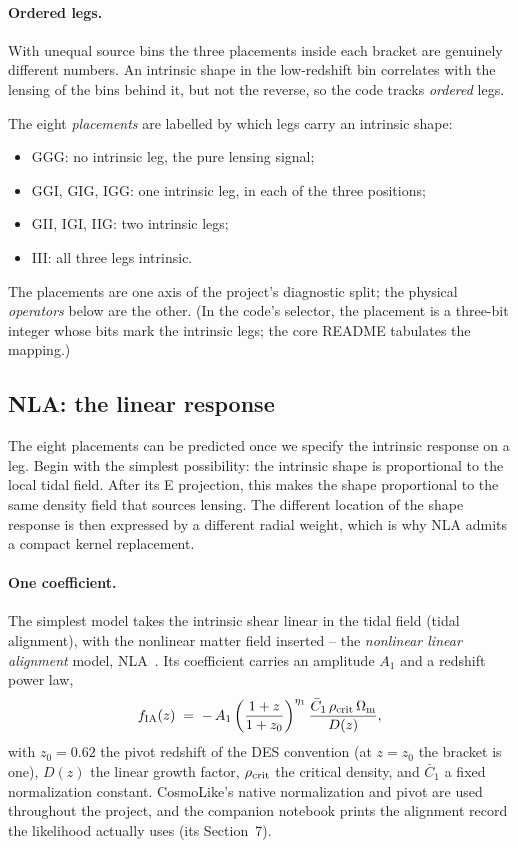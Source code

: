 \documentclass[11pt]{article}
\numberwithin{equation}{section}
\begin{document}
\paragraph{Ordered legs.}
With unequal source bins the three placements inside each bracket
are genuinely different numbers.  An intrinsic shape in the
low-redshift bin correlates with the lensing of the bins behind it,
but not the reverse, so the code tracks \emph{ordered} legs.

The eight \emph{placements} are labelled by which legs carry an
intrinsic shape:
\begin{itemize}
  \item GGG: no intrinsic leg, the pure lensing signal;
  \item GGI, GIG, IGG: one intrinsic leg, in each of the three
    positions;
  \item GII, IGI, IIG: two intrinsic legs;
  \item III: all three legs intrinsic.
\end{itemize}
The placements are one axis of the project's diagnostic split; the
physical \emph{operators} below are the other.  (In the code's
selector, the placement is a three-bit integer whose bits mark the
intrinsic legs; the core README tabulates the mapping.)

\subsection{NLA: the linear response}
\label{sec:nla}

The eight placements can be predicted once we specify the intrinsic
response on a leg. Begin with the simplest possibility: the intrinsic
shape is proportional to the local tidal field. After its E projection,
this makes the shape proportional to the same density field that sources
lensing. The different location of the shape response is then expressed
by a different radial weight, which is why NLA admits a compact kernel
replacement.

\paragraph{One coefficient.}
The simplest model takes the intrinsic shear linear in the tidal
field (tidal alignment), with the nonlinear matter field inserted --
the \emph{nonlinear linear alignment} model, NLA~\cite{HirataSeljak,
BridleKing}.  Its coefficient carries an amplitude $A_1$ and a
redshift power law,
\begin{equation}
  f_{\rm IA}(z)
  \;=\;
  -\,A_1
  \left(\frac{1+z}{1+z_0}\right)^{\eta_1}
  \frac{\bar C_1\, \rho_{\rm crit}\, \Omega_{\rm m}}{D(z)} ,
  \label{eq:fia}
\end{equation}
with $z_0 = 0.62$ the pivot redshift of the DES convention (at
$z = z_0$ the bracket is one), $D(z)$ the linear growth factor,
$\rho_{\rm crit}$ the critical density, and $\bar C_1$ a fixed
normalization constant.  CosmoLike's native normalization and pivot
are used throughout the project, and the companion notebook prints
the alignment record the likelihood actually uses (its Section~7).
\end{document}
